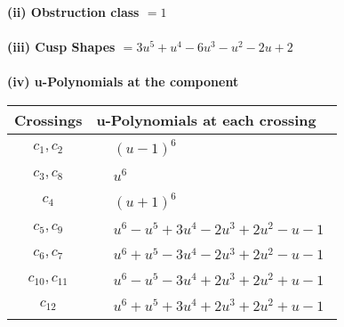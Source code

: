 \documentclass[1p]{elsarticle_modified}
\theoremstyle{definition}
\begin{document}
\flushleft \textbf{(ii) Obstruction class $= 1$}\\~\\
\flushleft \textbf{(iii) Cusp Shapes $= 3 u^5+u^4-6 u^3- u^2-2 u+2$}\\~\\
\newpage\renewcommand{\arraystretch}{1}
\flushleft \textbf{(iv) u-Polynomials at the component}\newline \\
\begin{tabular}{m{50pt}|m{274pt}}
Crossings & \hspace{64pt}u-Polynomials at each crossing \\
\hline $$\begin{aligned}c_{1},c_{2}\end{aligned}$$&$\begin{aligned}
&(u-1)^6
\end{aligned}$\\
\hline $$\begin{aligned}c_{3},c_{8}\end{aligned}$$&$\begin{aligned}
&u^6
\end{aligned}$\\
\hline $$\begin{aligned}c_{4}\end{aligned}$$&$\begin{aligned}
&(u+1)^6
\end{aligned}$\\
\hline $$\begin{aligned}c_{5},c_{9}\end{aligned}$$&$\begin{aligned}
&u^6- u^5+3 u^4-2 u^3+2 u^2- u-1
\end{aligned}$\\
\hline $$\begin{aligned}c_{6},c_{7}\end{aligned}$$&$\begin{aligned}
&u^6+u^5-3 u^4-2 u^3+2 u^2- u-1
\end{aligned}$\\
\hline $$\begin{aligned}c_{10},c_{11}\end{aligned}$$&$\begin{aligned}
&u^6- u^5-3 u^4+2 u^3+2 u^2+u-1
\end{aligned}$\\
\hline $$\begin{aligned}c_{12}\end{aligned}$$&$\begin{aligned}
&u^6+u^5+3 u^4+2 u^3+2 u^2+u-1
\end{aligned}$\\
\hline
\end{tabular}\\~\\
\end{document}
